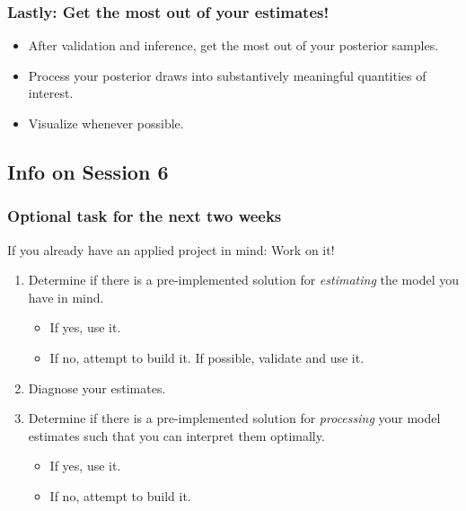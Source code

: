 \documentclass[
  11pt,
]{article}
\providecommand{\tightlist}{%
  \setlength{\itemsep}{0pt}\setlength{\parskip}{0pt}}
\begin{document}
\hypertarget{lastly-get-the-most-out-of-your-estimates}{%
\subsubsection{Lastly: Get the most out of your estimates!}\label{lastly-get-the-most-out-of-your-estimates}}

\begin{itemize}
\tightlist
\item
  After validation and inference, get the most out of your posterior samples.
\item
  Process your posterior draws into substantively meaningful quantities of interest.
\item
  Visualize whenever possible.
\end{itemize}

\hypertarget{info-on-session-6}{%
\subsection{Info on Session 6}\label{info-on-session-6}}

\hypertarget{optional-task-for-the-next-two-weeks}{%
\subsubsection{Optional task for the next two weeks}\label{optional-task-for-the-next-two-weeks}}

If you already have an applied project in mind: Work on it!

\begin{enumerate}
\def\labelenumi{\arabic{enumi}.}
\tightlist
\item
  Determine if there is a pre-implemented solution for \emph{estimating} the model you have in mind.

  \begin{itemize}
  \tightlist
  \item
    If yes, use it.
  \item
    If no, attempt to build it. If possible, validate and use it.
  \end{itemize}
\item
  Diagnose your estimates.
\item
  Determine if there is a pre-implemented solution for \emph{processing} your model estimates such that you can interpret them optimally.

  \begin{itemize}
  \tightlist
  \item
    If yes, use it.
  \item
    If no, attempt to build it.
  \end{itemize}
\end{enumerate}
\end{document}
